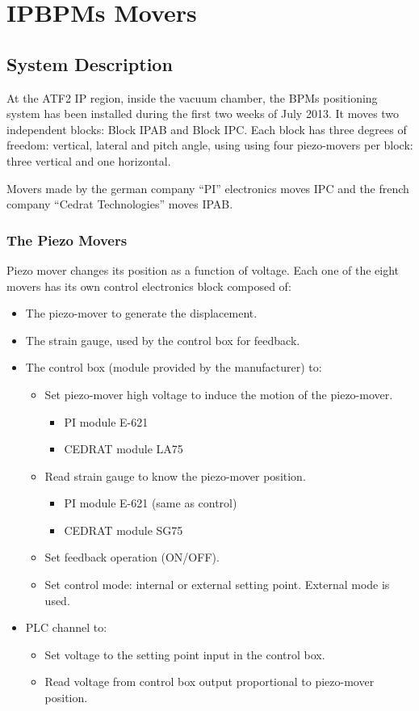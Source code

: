 \chapter{IPBPMs Movers}\label{s:annexB}
\section{System Description}
At the ATF2 IP region, inside the vacuum chamber, the BPMs positioning system has been installed during the first two weeks of July 2013. It moves two independent blocks: Block IPAB and Block IPC. Each block has three degrees of freedom: vertical, lateral and pitch angle, using using four piezo-movers per block: three vertical and one horizontal.\par
Movers made by the german company ``PI'' electronics moves IPC and the french company ``Cedrat Technologies'' moves IPAB.\par
\subsection{The Piezo Movers}
Piezo mover changes its position as a function of voltage. Each one of the eight movers has its own control electronics block composed of: 
\begin{itemize}
 \item The piezo-mover to generate the displacement.
\item The strain gauge, used by the control box for feedback.
\item The control box (module provided by the manufacturer) to:
\begin{itemize}
 \item Set piezo-mover high voltage to induce the motion of the piezo-mover.
 \begin{itemize}
\item PI module E-621
\item CEDRAT module LA75
\end{itemize}
\item Read strain gauge to know the piezo-mover position.
\begin{itemize}
\item PI module E-621 (same as control)
\item CEDRAT module SG75
\end{itemize}
\item Set feedback operation (ON/OFF).
\item Set control mode: internal or external setting point. External mode is used.
\end{itemize}
\item PLC channel to:
\begin{itemize}
\item Set voltage to the setting point input in the control box.
\item Read voltage from control box output proportional to piezo-mover position.
\end{itemize}
\end{itemize}

